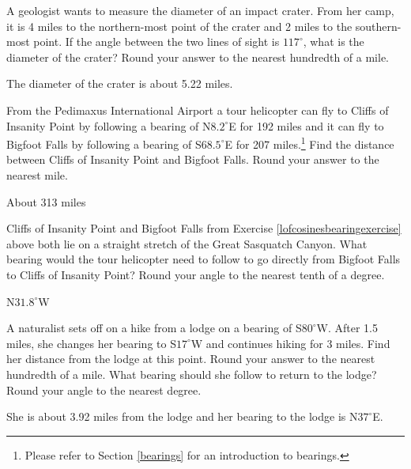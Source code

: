 \documentclass{ximera}
\begin{document}
\begin{problem}
A geologist wants to measure the diameter of an impact crater.   From her camp, it is 4 miles to the northern-most point of the crater and 2 miles to the southern-most point.  If the angle between the two lines of sight is $117^{\circ}$, what is the diameter of the crater?  Round your answer to the nearest hundredth of a mile.

\begin{solution}
The diameter of the crater is about 5.22 miles.
\end{solution}
\end{problem}

\begin{problem} \label{lofcosinesbearingexercise}
From the Pedimaxus International Airport a tour helicopter can fly to Cliffs of Insanity Point by following a bearing of N$8.2^{\circ}$E for 192 miles and it can fly to Bigfoot Falls by following a bearing of S$68.5^{\circ}$E for 207 miles.\footnote{Please refer to Section \ref{bearings} for an introduction to bearings.}  Find the distance between Cliffs of Insanity Point and Bigfoot Falls.  Round your answer to the nearest mile.  

\begin{solution}
About 313 miles
\end{solution}
\end{problem}

\begin{problem}
Cliffs of Insanity Point and Bigfoot Falls from Exercise \ref{lofcosinesbearingexercise} above both lie on a straight stretch of the Great Sasquatch Canyon.  What bearing would the tour helicopter need to follow to go directly from Bigfoot Falls to Cliffs of Insanity Point?  Round your angle to the nearest tenth of a degree.

\begin{solution}
N$31.8^{\circ}$W
\end{solution}
\end{problem}

\begin{problem}
A naturalist sets off on a hike from a lodge on a bearing of S$80^{\circ}$W.  After 1.5 miles, she changes her bearing to S$17^{\circ}$W and continues hiking for 3 miles.  Find her distance from the lodge at this point.  Round your answer to the nearest hundredth of a mile.  What bearing should she follow to return to the lodge?  Round your angle to the nearest degree.

\begin{solution}
She is about 3.92 miles from the lodge and her bearing to the lodge is N$37^{\circ}$E.
\end{solution}
\end{problem}
\end{document}
